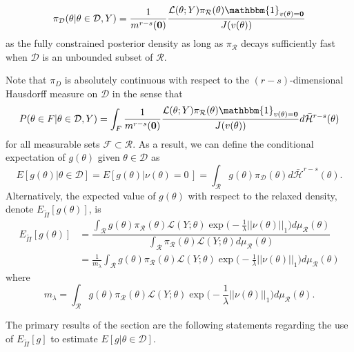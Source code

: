 \documentclass[10pt,fleqn]{article}
\DeclareMathOperator{\1}{\mathbbm{1}}
\begin{document}
\begin{equation}
\label{EQ:Constrained_rcp}
\pi_\mathcal{D}(\theta|\theta\in\mathcal{D},Y) = \frac{1}{m^{r-s}(\bf{0})} \frac{\mathcal{L}(\theta; Y) \pi_\mathcal{R}(\theta) \mathbbm{1}_{v(\theta)=\bf{0}}}{J(v(\theta))}
\end{equation} 
as the fully constrained posterior density as long as $\pi_\mathcal{R}$ decays sufficiently fast when $\mathcal{D}$ is an unbounded subset of $\mathcal{R}.$ 
  
Note that $\pi_D$ is absolutely continuous with respect to the $(r-s)$-dimensional Hausdorff measure on $\mathcal{D}$ in the sense that $$P(\theta \in F|\theta\in\mathcal{D},Y) =  \int_F \frac{1}{m^{r-s}(\bf{0})} \frac{\mathcal{L}(\theta; Y) \pi_\mathcal{R}(\theta) \mathbbm{1}_{v(\theta)=\bf{0}}}{J(v(\theta))}d\bar{\mathcal{H}}^{r-s}(\theta)$$ for all measurable sets $\mathcal{F}\subset \mathcal{R}$. As a result, we can define the conditional  expectation of $g(\theta)$ given $\theta \in \mathcal{D}$ as 
$$E[g(\theta) | \theta\in\mathcal{D}] = E[g(\theta) | \nu(\theta) =0\,] = \int_\mathcal{R} g(\theta) \pi_\mathcal{D}(\theta) d\bar{\mathcal{H}}^{r-s}(\theta).$$
Alternatively, the expected value of $g(\theta)$ with respect to the relaxed density, denote $E_{\tilde{\Pi}}[g(\theta)] $, is 
\begin{equation}
\begin{split}
E_{\tilde{\Pi}}[g(\theta)] &= \dfrac{\int_\mathcal{R} g(\theta) \pi_\mathcal{R}(\theta) \mathcal{L}(Y;\theta) \exp\bigg(-\frac{1}{\lambda}||\nu (\theta)||_1\bigg) d\mu_\mathcal{R}(\theta) }{\int_\mathcal{R} \pi_\mathcal{R}(\theta) \mathcal{L}(Y;\theta) d\mu_\mathcal{R}(\theta) } \\
&= \frac{1}{m_\lambda} \int_\mathcal{R} g(\theta) \pi_\mathcal{R}(\theta) \mathcal{L}(Y;\theta)\exp\bigg(-\frac{1}{\lambda}||\nu (\theta)||_1\bigg) d\mu_\mathcal{R}(\theta)
\end{split}
\end{equation}
where $$m_\lambda = \int_\mathcal{R} g(\theta) \pi_\mathcal{R}(\theta) \mathcal{L}(Y;\theta)\exp\bigg(-\frac{1}{\lambda}||\nu (\theta)||_1\bigg) d\mu_\mathcal{R}(\theta).$$


The primary results of the section are the following statements regarding the use of $E_{\tilde{\Pi}}[g]$ to estimate $E[g|\theta\in\mathcal{D}]$.
\end{document}
